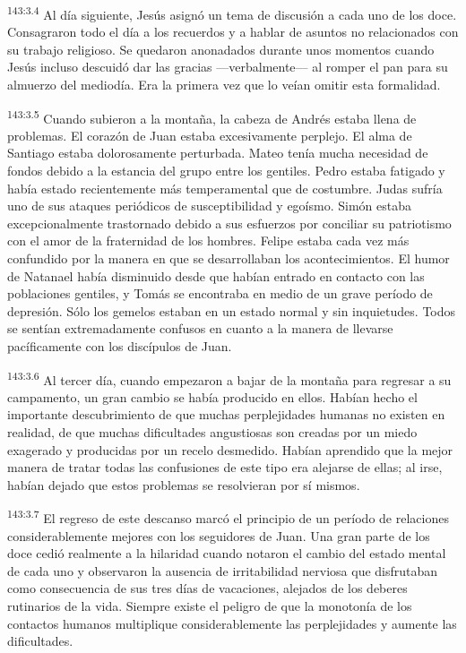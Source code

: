 \par
\textsuperscript{143:3.4} Al día siguiente, Jesús asignó un tema de discusión a cada uno de los doce. Consagraron todo el día a los recuerdos y a hablar de asuntos no relacionados con su trabajo religioso. Se quedaron anonadados durante unos momentos cuando Jesús incluso descuidó dar las gracias ---verbalmente--- al romper el pan para su almuerzo del mediodía. Era la primera vez que lo veían omitir esta formalidad.

\par
\textsuperscript{143:3.5} Cuando subieron a la montaña, la cabeza de Andrés estaba llena de problemas. El corazón de Juan estaba excesivamente perplejo. El alma de Santiago estaba dolorosamente perturbada. Mateo tenía mucha necesidad de fondos debido a la estancia del grupo entre los gentiles. Pedro estaba fatigado y había estado recientemente más temperamental que de costumbre. Judas sufría uno de sus ataques periódicos de susceptibilidad y egoísmo. Simón estaba excepcionalmente trastornado debido a sus esfuerzos por conciliar su patriotismo con el amor de la fraternidad de los hombres. Felipe estaba cada vez más confundido por la manera en que se desarrollaban los acontecimientos. El humor de Natanael había disminuido desde que habían entrado en contacto con las poblaciones gentiles, y Tomás se encontraba en medio de un grave período de depresión. Sólo los gemelos estaban en un estado normal y sin inquietudes. Todos se sentían extremadamente confusos en cuanto a la manera de llevarse pacíficamente con los discípulos de Juan.

\par
\textsuperscript{143:3.6} Al tercer día, cuando empezaron a bajar de la montaña para regresar a su campamento, un gran cambio se había producido en ellos. Habían hecho el importante descubrimiento de que muchas perplejidades humanas no existen en realidad, de que muchas dificultades angustiosas son creadas por un miedo exagerado y producidas por un recelo desmedido. Habían aprendido que la mejor manera de tratar todas las confusiones de este tipo era alejarse de ellas; al irse, habían dejado que estos problemas se resolvieran por sí mismos.

\par
\textsuperscript{143:3.7} El regreso de este descanso marcó el principio de un período de relaciones considerablemente mejores con los seguidores de Juan. Una gran parte de los doce cedió realmente a la hilaridad cuando notaron el cambio del estado mental de cada uno y observaron la ausencia de irritabilidad nerviosa que disfrutaban como consecuencia de sus tres días de vacaciones, alejados de los deberes rutinarios de la vida. Siempre existe el peligro de que la monotonía de los contactos humanos multiplique considerablemente las perplejidades y aumente las dificultades.


